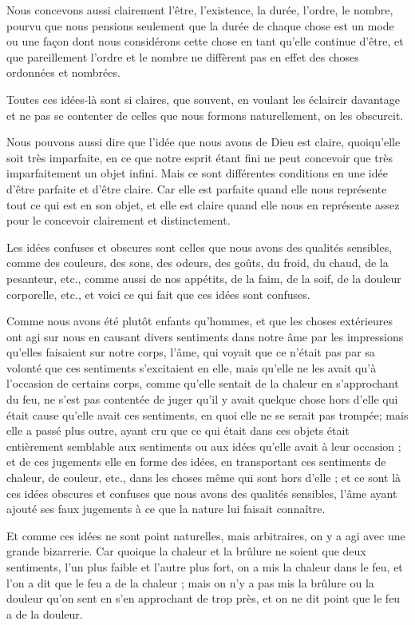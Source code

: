 Nous concevons aussi clairement l'être, l'existence, la durée, l'ordre, le nombre, pourvu que nous pensions seulement que la durée de chaque chose est un mode ou une façon dont nous considérons cette chose en tant qu'elle continue d'être, et que pareillement l'ordre et le nombre ne diffèrent pas en effet des choses ordonnées et nombrées.

Toutes ces idées-là sont si claires, que souvent, en voulant les éclaircir davantage et ne pas se contenter de celles que nous formons naturellement, on les obscurcit.

Nous pouvons aussi dire que l'idée que nous avons de Dieu est claire, quoiqu'elle soit très imparfaite, en ce que notre esprit étant fini ne peut concevoir que très imparfaitement un objet infini. Mais ce sont différentes conditions en une idée d'être parfaite et d'être claire. Car elle est parfaite quand elle nous représente tout ce qui est en son objet, et elle est claire quand elle nous en représente assez pour le concevoir clairement et distinctement.

Les idées confuses et obscures sont celles que nous avons des qualités sensibles, comme des couleurs, des sons, des odeurs, des goûts, du froid, du chaud, de la pesanteur, etc., comme aussi de nos appétits, de la faim, de la soif, de la douleur corporelle, etc., et voici ce qui fait que ces idées sont confuses.

Comme nous avons été plutôt enfants qu'hommes, et que les choses extérieures ont agi sur nous en causant divers sentiments dans notre âme par les impressions qu'elles faisaient sur notre corps, l'âme, qui voyait que ce n'était pas par sa volonté que ces sentiments s'excitaient en elle, mais qu'elle ne les avait qu'à l'occasion de certains corps, comme qu'elle sentait de la chaleur en s'approchant du feu, ne s'est pas contentée de juger qu'il y avait quelque chose hors d'elle qui était cause qu'elle avait ces sentiments, en quoi elle ne se serait pas trompée; mais elle a passé plus outre, ayant cru que ce qui était dans ces objets était entièrement semblable aux sentiments ou aux idées qu'elle avait à leur occasion ; et de ces jugements elle en forme des idées, en transportant ces sentiments de chaleur, de couleur, etc., dans les choses même qui sont hors d'elle ; et ce sont là ces idées obscures et confuses que nous avons des qualités sensibles, l'âme ayant ajouté ses faux jugements à ce que la nature lui faisait connaître.

Et comme ces idées ne sont point naturelles, mais arbitraires, on y a agi avec une grande bizarrerie. Car quoique la chaleur et la brûlure ne soient que deux sentiments, l'un plus faible et l'autre plus fort, on a mis la chaleur dans le feu, et l'on a dit que le feu a de la chaleur ; mais on n'y a pas mis la brûlure ou la douleur qu'on sent en s'en approchant de trop près, et on ne dit point que le feu a de la douleur.

